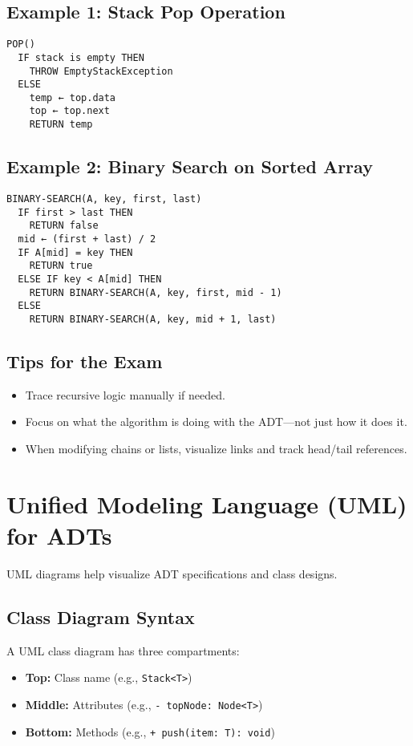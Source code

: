 \documentclass[11pt]{article}
\begin{document}
\subsection*{Example 1: Stack Pop Operation}
\begin{verbatim}
POP()
  IF stack is empty THEN
    THROW EmptyStackException
  ELSE
    temp ← top.data
    top ← top.next
    RETURN temp
\end{verbatim}

\subsection*{Example 2: Binary Search on Sorted Array}
\begin{verbatim}
BINARY-SEARCH(A, key, first, last)
  IF first > last THEN
    RETURN false
  mid ← (first + last) / 2
  IF A[mid] = key THEN
    RETURN true
  ELSE IF key < A[mid] THEN
    RETURN BINARY-SEARCH(A, key, first, mid - 1)
  ELSE
    RETURN BINARY-SEARCH(A, key, mid + 1, last)
\end{verbatim}

\subsection*{Tips for the Exam}
\begin{itemize}
  \item Trace recursive logic manually if needed.
  \item Focus on what the algorithm is doing with the ADT—not just how it does it.
  \item When modifying chains or lists, visualize links and track head/tail references.
\end{itemize}

\hrulefill

\section*{Unified Modeling Language (UML) for ADTs}

UML diagrams help visualize ADT specifications and class designs.

\subsection*{Class Diagram Syntax}
A UML class diagram has three compartments:
\begin{itemize}
  \item \textbf{Top:} Class name (e.g., \texttt{Stack<T>})
  \item \textbf{Middle:} Attributes (e.g., \texttt{- topNode: Node<T>})
  \item \textbf{Bottom:} Methods (e.g., \texttt{+ push(item: T): void})
\end{itemize}
\end{document}
